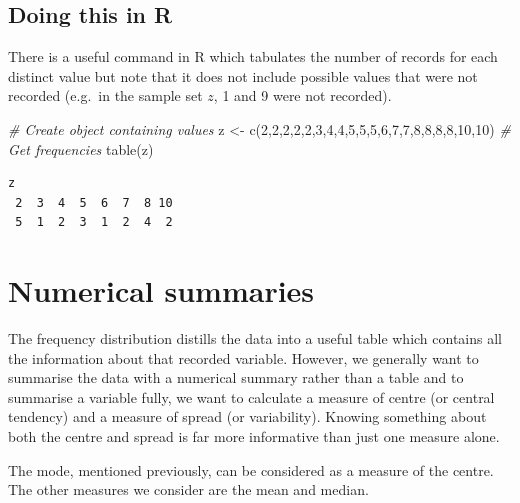 \documentclass[
  oneside]{krantz}
\newenvironment{Shaded}{\begin{snugshade}}{\end{snugshade}}
\newcommand{\CommentTok}[1]{\textcolor[rgb]{0.56,0.35,0.01}{\textit{#1}}}
\newcommand{\DecValTok}[1]{\textcolor[rgb]{0.00,0.00,0.81}{#1}}
\newcommand{\FunctionTok}[1]{\textcolor[rgb]{0.00,0.00,0.00}{#1}}
\newcommand{\NormalTok}[1]{#1}
\newcommand{\OtherTok}[1]{\textcolor[rgb]{0.56,0.35,0.01}{#1}}
\begin{document}
\hypertarget{doing-this-in-r-2}{%
\subsection{Doing this in R}\label{doing-this-in-r-2}}

There is a useful command in R which tabulates the number of records for each distinct value but note that it does not include possible values that were not recorded (e.g.~in the sample set \(z\), 1 and 9 were not recorded).

\begin{Shaded}
\begin{Highlighting}[]
\CommentTok{\# Create object containing values}
\NormalTok{z }\OtherTok{\textless{}{-}} \FunctionTok{c}\NormalTok{(}\DecValTok{2}\NormalTok{,}\DecValTok{2}\NormalTok{,}\DecValTok{2}\NormalTok{,}\DecValTok{2}\NormalTok{,}\DecValTok{2}\NormalTok{,}\DecValTok{3}\NormalTok{,}\DecValTok{4}\NormalTok{,}\DecValTok{4}\NormalTok{,}\DecValTok{5}\NormalTok{,}\DecValTok{5}\NormalTok{,}\DecValTok{5}\NormalTok{,}\DecValTok{6}\NormalTok{,}\DecValTok{7}\NormalTok{,}\DecValTok{7}\NormalTok{,}\DecValTok{8}\NormalTok{,}\DecValTok{8}\NormalTok{,}\DecValTok{8}\NormalTok{,}\DecValTok{8}\NormalTok{,}\DecValTok{10}\NormalTok{,}\DecValTok{10}\NormalTok{)}
\CommentTok{\# Get frequencies}
\FunctionTok{table}\NormalTok{(z)}
\end{Highlighting}
\end{Shaded}

\begin{verbatim}
z
 2  3  4  5  6  7  8 10 
 5  1  2  3  1  2  4  2 
\end{verbatim}

\hypertarget{numerical-summaries}{%
\section{Numerical summaries}\label{numerical-summaries}}

The frequency distribution distills the data into a useful table which contains all the information about that recorded variable. However, we generally want to summarise the data with a numerical summary rather than a table and to summarise a variable fully, we want to calculate a measure of centre (or central tendency) and a measure of spread (or variability). Knowing something about both the centre and spread is far more informative than just one measure alone.

The mode, mentioned previously, can be considered as a measure of the centre. The other measures we consider are the mean and median.
\end{document}
